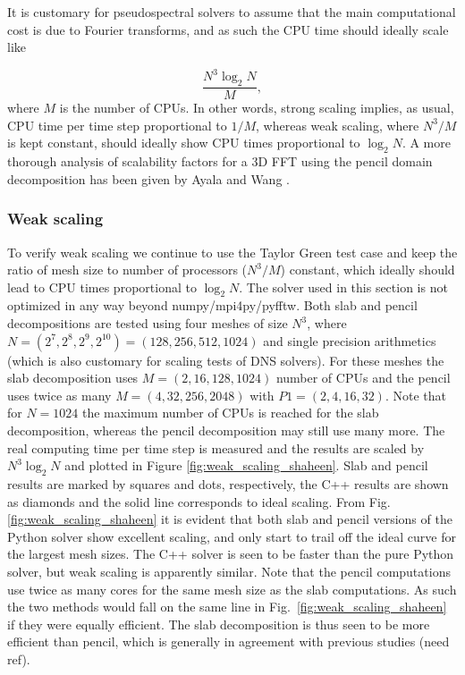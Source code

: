 \documentclass[11pt, oneside]{article}
\begin{document}
It is customary for pseudospectral solvers to assume that the main computational cost is due to Fourier transforms, and as such the CPU time should ideally scale like

\begin{equation}
 \frac{N^3 \log_2 N}{M},
\end{equation}
where $M$ is the number of CPUs. In other words, strong scaling implies, as usual, CPU time per time step proportional to $1/M$, whereas weak scaling, where $N^3/M$ is kept constant, should ideally show CPU times proportional to $\log_2 N$. A more thorough analysis of scalability factors for a 3D FFT using the pencil domain decomposition has been given by Ayala and Wang \cite{ayala2013}.



\subsubsection{Weak scaling}
To verify weak scaling we continue to use the Taylor Green test case and keep the ratio of mesh size to number of processors ($N^3/M$) constant, which ideally should lead to CPU times proportional to $\log_2 N$. The solver used in this section is not optimized in any way beyond numpy/mpi4py/pyfftw. 
Both slab and pencil decompositions are tested using four meshes of size $N^3$, where $N=(2^7, 2^8, 2^9, 2^{10}) =(128, 256, 512, 1024)$ and single precision arithmetics (which is also customary for scaling tests of DNS solvers). For these meshes the slab decomposition uses $M=(2, 16, 128, 1024)$ number of CPUs and the pencil uses twice as many $M=(4, 32, 256, 2048)$ with $P1=(2, 4, 16, 32)$. 
Note that for $N=1024$ the maximum number of CPUs is reached for the slab decomposition, whereas the pencil 
decomposition may still use many more. The real computing time per time step is measured and the results 
are scaled by $N^3 \log_2N$ and plotted in Figure \ref{fig:weak_scaling_shaheen}. Slab and pencil results 
are marked by squares and dots, respectively, the C++ results are shown as diamonds and the solid line 
corresponds to ideal scaling. From Fig. \ref{fig:weak_scaling_shaheen} it is evident that both slab and pencil versions of the Python solver show excellent scaling, 
and only start to trail off the ideal curve for the largest mesh sizes. The C++ solver is seen to be faster than the pure
Python solver, but weak scaling is apparently similar. Note that the pencil computations use twice as many cores for the same mesh 
size as the slab computations. As such the two methods would fall on the same line in 
Fig.~\ref{fig:weak_scaling_shaheen} if they were equally efficient. The slab decomposition is thus seen to 
be more efficient than pencil, which is generally in agreement with previous studies (need ref).
\end{document}
